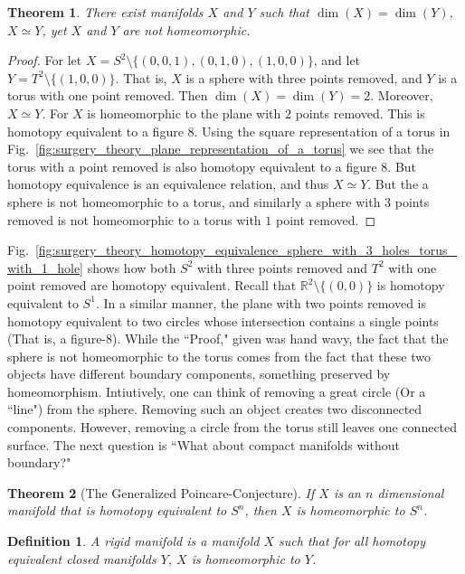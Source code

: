 \documentclass{article}
\theoremstyle{mystyle}
\newtheorem{theorem}{Theorem}[section]
\newtheorem{definition}{Definition}[section]
\begin{document}
\begin{theorem}
There exist manifolds $X$ and $Y$ such that $\dim(X) = \dim(Y)$, $X\simeq Y$, yet $X$ and $Y$ are not homeomorphic.
\end{theorem}
\begin{proof}
For let $X = S^{2}\setminus\{(0,0,1),(0,1,0),(1,0,0)\}$, and let $Y = T^{2}\setminus\{(1,0,0)\}$. That is, $X$ is a sphere with three points removed, and $Y$ is a torus with one point removed. Then $\dim(X) = \dim(Y) = 2$. Moreover, $X\simeq Y$. For $X$ is homeomorphic to the plane with $2$ points removed. This is homotopy equivalent to a figure $8$. Using the square representation of a torus in Fig.~\ref{fig:surgery_theory_plane_representation_of_a_torus} we see that the torus with a point removed is also homotopy equivalent to a figure $8$. But homotopy equivalence is an equivalence relation, and thus $X\simeq Y$. But the a sphere is not homeomorphic to a torus, and similarly a sphere with $3$ points removed is not homeomorphic to a torus with $1$ point removed.
\end{proof}
Fig.~\ref{fig:surgery_theory_homotopy_equivalence_sphere_with_3_holes_torus_with_1_hole} shows how both $S^{2}$ with three points removed and $T^{2}$ with one point removed are homotopy equivalent. Recall that $\mathbb{R}^{2}\setminus \{(0,0)\}$ is homotopy equivalent to $S^{1}$. In a similar manner, the plane with two points removed is homotopy equivalent to two circles whose intersection contains a single points (That is, a figure-$8$). While the ``Proof," given was hand wavy, the fact that the sphere is not homeomorphic to the torus comes from the fact that these two objects have different boundary components, something preserved by homeomorphism. Intiutively, one can think of removing a great circle (Or a ``line") from the sphere. Removing such an object creates two disconnected components. However, removing a circle from the torus still leaves one connected surface. The next question is ``What about compact manifolds without boundary?"
\begin{theorem}[The Generalized Poincare-Conjecture]
If $X$ is an $n$ dimensional manifold that is homotopy equivalent to $S^{n}$, then $X$ is homeomorphic to $S^{n}$.
\end{theorem}
\begin{definition}
A rigid manifold is a manifold $X$ such that for all homotopy equivalent closed manifolds $Y$, $X$ is homeomorphic to $Y$.
\end{definition}
\end{document}
